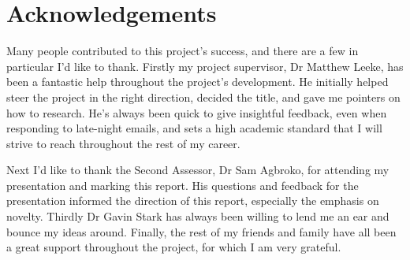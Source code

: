 \section*{Acknowledgements}

\vspace{2cm}

\large

Many people contributed to this project's success, and there are a few in particular I'd like to thank.
Firstly my project supervisor, Dr Matthew Leeke, has been a fantastic help throughout the project's development.
He initially helped steer the project in the right direction, decided the title, and gave me pointers on how to research.
He's always been quick to give insightful feedback, even when responding to late-night emails, and sets a high academic standard that I will strive to reach throughout the rest of my career.

Next I'd like to thank the Second Assessor, Dr Sam Agbroko, for attending my presentation and marking this report.
His questions and feedback for the presentation informed the direction of this report, especially the emphasis on novelty.
Thirdly Dr Gavin Stark has always been willing to lend me an ear and bounce my ideas around.
Finally, the rest of my friends and family have all been a great support throughout the project, for which I am very grateful.
